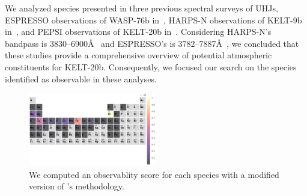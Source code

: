 \documentclass[twocolumn]{aastex631}
\begin{document}
            We analyzed species presented in three previous spectral surveys of UHJs, ESPRESSO observations of WASP-76b in~\citet{Kesseli2022}, HARPS-N observations of KELT-9b in~\citet{Hoeijmakers2019}, and PEPSI observations of KELT-20b in~\citet{Petz2023}. Considering HARPS-N's bandpass is 3830--6900\AA~\citep{Cosentino2012} and ESPRESSO's is 3782--7887\AA~\citep{Pepe2021}, we concluded that these studies provide a comprehensive overview of potential atmospheric constituents for KELT-20b. Consequently, we focused our search on the species identified as observable in these analyses.

            \begin{figure}
                \centering
                \includegraphics[width=0.5\textwidth]{observability_scores.png}
                \caption{We computed an observablity score for each species with a modified version of \citet{Kesseli2022}'s methodology.}
                \label{fig:enter-label}
            \end{figure}
            
\end{document}

